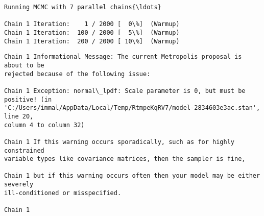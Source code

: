 \documentclass[11pt]{article}
\begin{document}
    \begin{Verbatim}[commandchars=\\\{\}]
Running MCMC with 7 parallel chains{\ldots}

Chain 1 Iteration:    1 / 2000 [  0\%]  (Warmup)
Chain 1 Iteration:  100 / 2000 [  5\%]  (Warmup)
Chain 1 Iteration:  200 / 2000 [ 10\%]  (Warmup)
    \end{Verbatim}

    \begin{Verbatim}[commandchars=\\\{\}]
Chain 1 Informational Message: The current Metropolis proposal is about to be
rejected because of the following issue:

Chain 1 Exception: normal\_lpdf: Scale parameter is 0, but must be positive! (in
'C:/Users/immal/AppData/Local/Temp/RtmpeKqRV7/model-2834603e3ac.stan', line 20,
column 4 to column 32)

Chain 1 If this warning occurs sporadically, such as for highly constrained
variable types like covariance matrices, then the sampler is fine,

Chain 1 but if this warning occurs often then your model may be either severely
ill-conditioned or misspecified.

Chain 1

    \end{Verbatim}
\end{document}

